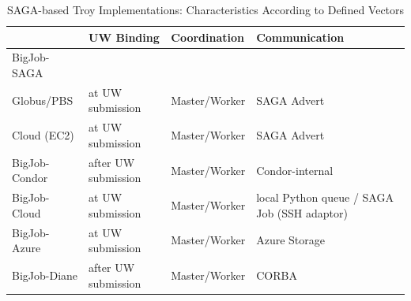 \documentclass[conference,final]{IEEEtran}
\begin{document}
\begin{table}[t]
\centering
\begin{tabular}{|p{1.8cm}|p{1.7cm}|p{1.7cm}|p{1.7cm}|}
	\hline
	&\textbf{UW Binding} &\textbf{Coordina\-tion} & \textbf{Communica\-tion} \\
	\hline
	BigJob-SAGA &&&\\
	\hline
	\hspace{2mm} Globus/PBS   &at UW submission
									  &Master/Worker &SAGA Advert \\  
	\hline
	\hspace{2mm} Cloud (EC2)  &at UW submission 
									  &Master/Worker &SAGA Advert \\ 
    \hline
   BigJob-Condor &after UW submission &Master/Worker &Condor-internal \\
	\hline
 	BigJob-Cloud &at UW submission   &Master/Worker 
				 &local Python queue / SAGA Job (SSH adaptor) \\ 
	\hline
	BigJob-Azure &at UW submission
	             &Master/Worker &Azure Storage \\ 
	\hline
    BigJob-Diane &after UW submission  &Master/Worker &CORBA  \\ 
	\hline	
\end{tabular}
\caption{SAGA-based Troy Implementations: Characteristics According to
  Defined Vectors} \label{tab:pilotjob_overview}
\end{table}		


\end{document}
